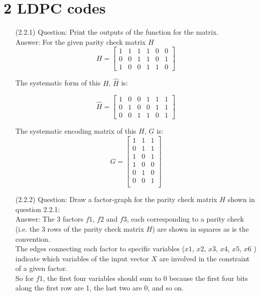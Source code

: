 \documentclass[a4paper,12pt]{article}
\begin{document}
\section*{2 LDPC codes}
\begin{enumerate}
\item[(2.2.1)]
Question: Print the outputs of the function for the matrix.\\
Answer: For the given parity check matrix $H$ \\

 \[
H = \begin{bmatrix}
    1 & 1 & 1 & 1 & 0 & 0 \\
    0 & 0 & 1 & 1 & 0 & 1 \\
    1 & 0 & 0 & 1 & 1 & 0
\end{bmatrix}
\]

The systematic form of this $H$, $\hat{H}$ is:

\[
\hat{H} = \begin{bmatrix}
    1 & 0 & 0 & 1 & 1 & 1 \\
    0 & 1 & 0 & 0 & 1 & 1 \\
    0 & 0 & 1 & 1 & 0 & 1
\end{bmatrix}
\]

The systematic encoding matrix of this $H$, ${G}$ is:\\
 
 \[
G = \begin{bmatrix}
    1 & 1 & 1 \\
    0 & 1 & 1 \\
    1 & 0 & 1 \\
    1 & 0 & 0 \\
    0 & 1 & 0 \\
    0 & 0 & 1 \\
\end{bmatrix}
\]

\item[(2.2.2)] Question: Draw a factor-graph for the parity check matrix $H$ shown in question 2.2.1: \\
Answer: The 3 factors $f1$, $f2$ and $f3$, each corresponding to a parity check (i.e. the 3 rows of the parity check matrix $H$) are shown in squares as is the convention. \\
The edges connecting each factor to specific variables ($x1$, $x2$, $x3$, $x4$, $x5$, $x6$ ) indicate which variables of the input vector $X$ are involved in the constraint of a given factor. \\
So for $f1$, the first four variables should sum to 0 because the first four bits along the first row are 1, the last two are 0, and so on.\\


\end{enumerate}
\end{document}
